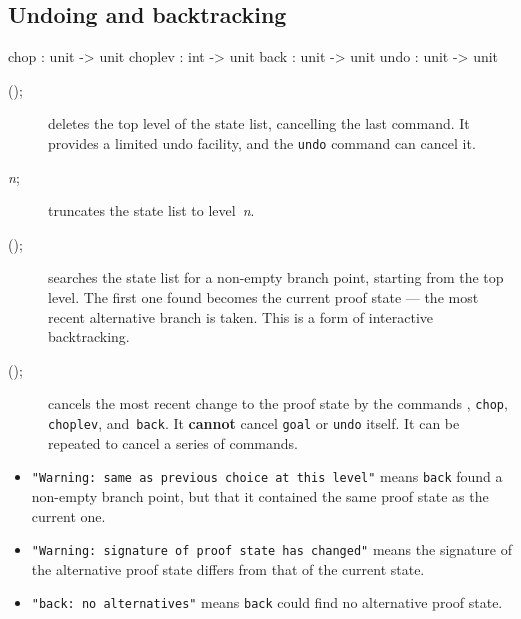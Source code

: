 \subsection{Undoing and backtracking}
\begin{ttbox} 
chop    : unit -> unit
choplev : int -> unit
back    : unit -> unit
undo    : unit -> unit
\end{ttbox}
\begin{description}
\item[();] 
deletes the top level of the state list, cancelling the last 
command.  It provides a limited undo facility, and the {\tt undo} command
can cancel it.

\item[ {\it n};] 
truncates the state list to level~{\it n}. 

\item[();]
searches the state list for a non-empty branch point, starting from the top
level.  The first one found becomes the current proof state --- the most
recent alternative branch is taken.  This is a form of interactive
backtracking.

\item[();] 
cancels the most recent change to the proof state by the commands ,
{\tt chop}, {\tt choplev}, and~{\tt back}.  It {\bf cannot}
cancel {\tt goal} or {\tt undo} itself.  It can be repeated to
cancel a series of commands.
\end{description}

\goodbreak
{}\par\nobreak
\begin{itemize}
\item{\footnotesize\tt"Warning:\ same as previous choice at this level"}
  means {\tt back} found a non-empty branch point, but that it contained
  the same proof state as the current one.
\item{\footnotesize\tt "Warning:\ signature of proof state has changed"}
  means the signature of the alternative proof state differs from that of
  the current state.
\item {\footnotesize\tt "back:\ no alternatives"} means {\tt back} could
  find no alternative proof state.
\end{itemize}

